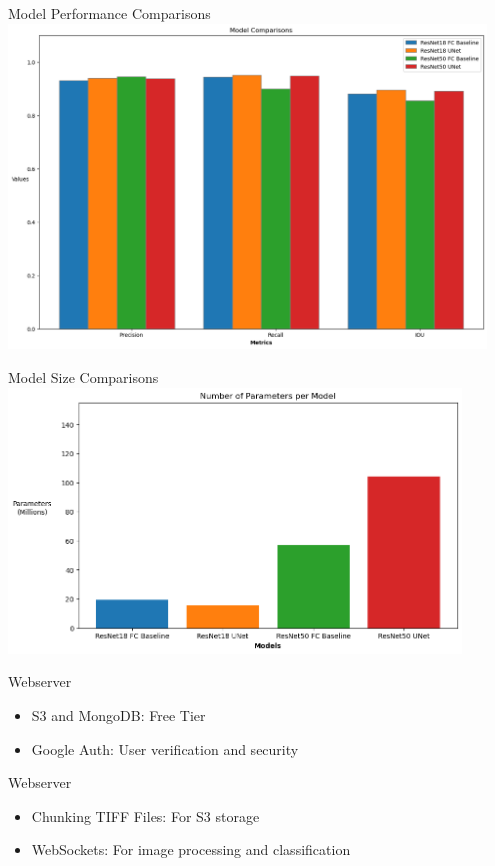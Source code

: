 \begin{frame}{Model Performance Comparisons}
    \centering
    \includegraphics[height=0.9\textheight,width=0.95\textwidth,keepaspectratio]{images/mm_performance.png}
\end{frame}

\begin{frame}{Model Size Comparisons}
    \centering
    \includegraphics[height=0.9\textheight,width=0.9\textwidth,keepaspectratio]{images/mm_params.png}
\end{frame}

\begin{frame}{Webserver}
    \begin{itemize}
        \item S3 and MongoDB: Free Tier
        \item Google Auth: User verification and security
    \end{itemize}    
\end{frame}

\begin{frame}{Webserver}
    \begin{itemize}
        \item Chunking TIFF Files: For S3 storage
        \item WebSockets: For image processing and classification
    \end{itemize}    
\end{frame}

